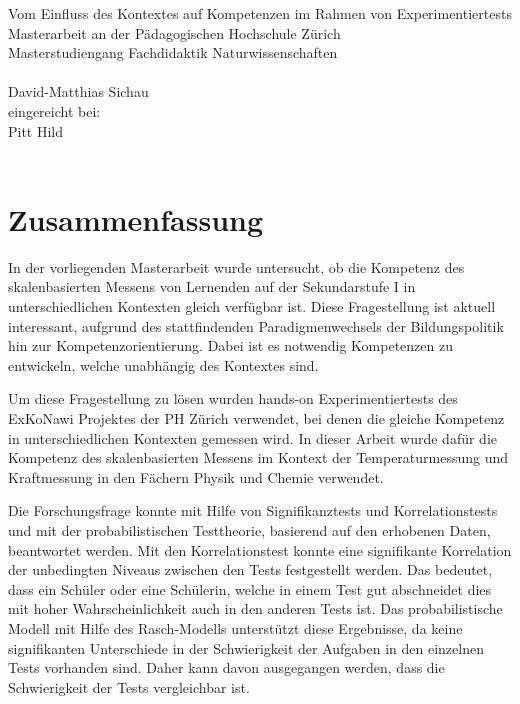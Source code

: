 \documentclass[12pt,oneside, DIV11]{scrbook}
\begin{document}
\frontmatter

\begin{titlepage}
	\vspace*{2cm}
	\begin{center}
		{\LARGE Vom Einfluss des Kontextes auf Kompetenzen im Rahmen von Experimentiertests
		 \vspace*{2cm}\\ Masterarbeit an der Pädagogischen Hochschule Zürich\vspace*{1cm}\\Masterstudiengang Fachdidaktik Naturwissenschaften\\}
		\vspace*{2cm}{\normalsize vorgelegt von:}\\ \large David-Matthias Sichau \\
		\vspace*{1.5cm} {\normalsize  eingereicht bei:}\\ \large Pitt Hild \\
		\vspace*{2cm}{\large 09. April 2015, Zürich}\\
	\end{center}
\end{titlepage}



\frontmatter 
\tableofcontents



\chapter*{Zusammenfassung}

In der vorliegenden Masterarbeit wurde untersucht, ob die Kompetenz des skalenbasierten Messens von Lernenden auf der Sekundarstufe I in unterschiedlichen Kontexten gleich verfügbar ist. Diese Fragestellung ist aktuell interessant, aufgrund des stattfindenden Paradigmenwechsels der Bildungspolitik hin zur Kompetenzorientierung. Dabei ist es notwendig Kompetenzen zu entwickeln, welche unabhängig des Kontextes sind.

Um diese Fragestellung zu lösen wurden hands-on Experimentiertests des ExKoNawi Projektes der PH Zürich verwendet, bei denen die gleiche Kompetenz in unterschiedlichen Kontexten gemessen wird. In dieser Arbeit wurde dafür die Kompetenz des skalenbasierten Messens im Kontext der Temperaturmessung und Kraftmessung in den Fächern Physik und Chemie verwendet.

Die Forschungsfrage konnte mit Hilfe von Signifikanztests und Korrelationstests und mit der probabilistischen Testtheorie, basierend auf den erhobenen Daten, beantwortet werden. Mit den Korrelationstest konnte eine signifikante Korrelation der unbedingten Niveaus zwischen den Tests festgestellt werden. Das bedeutet, dass ein Schüler oder eine Schülerin, welche in einem Test gut abschneidet dies mit hoher Wahrscheinlichkeit auch in den anderen Tests ist. Das probabilistische Modell mit Hilfe des Rasch-Modells unterstützt diese Ergebnisse, da keine signifikanten Unterschiede in der Schwierigkeit der Aufgaben in den einzelnen Tests vorhanden sind. Daher kann davon ausgegangen werden, dass die Schwierigkeit der Tests vergleichbar ist.
\end{document}

